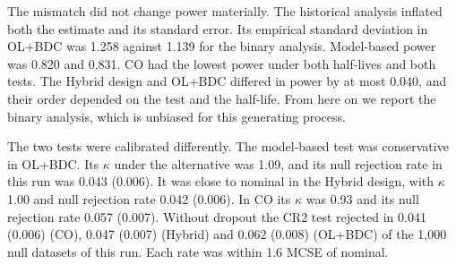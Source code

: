 \documentclass[
  11pt,
]{article}
\begin{document}
\begin{table}
\centering
\caption{\label{tab:tab-calib}Performance without dropout. Bias (MCSE) against the true value $-3.60$. Emp. SD: empirical standard deviation of the estimates. MB: model-based test. CR2: cluster-robust test with Satterthwaite degrees of freedom. Cover: coverage of the 95 percent interval. Size: rejection rate in the null regime. MCSE of power at most 0.014; of size at most 0.008.}
\centering
{}
\end{table}

The mismatch did not change power materially. The historical analysis
inflated both the estimate and its standard error. Its empirical
standard deviation in OL+BDC was
1.258 against
1.139 for the binary
analysis. Model-based power was
0.820 and
0.831. CO had the lowest
power under both half-lives and both tests. The Hybrid design and
OL+BDC differed in power by at most
0.040, and their order depended on the test and
the half-life. From here on we report the binary analysis, which is
unbiased for this generating process.

The two tests were calibrated differently. The model-based test was
conservative in OL+BDC. Its \(\kappa\) under the alternative was
1.09, and its null
rejection rate in this run was
0.043 (0.006).
It was close to nominal in the Hybrid design, with \(\kappa\)
1.00 and null rejection
rate
0.042 (0.006).
In CO its \(\kappa\) was
0.93 and its null rejection
rate
0.057 (0.007).
Without dropout the CR2 test rejected in
0.041 (0.006)
(CO),
0.047 (0.007)
(Hybrid) and
0.062 (0.008)
(OL+BDC) of the 1,000 null datasets of this run.
Each rate was within 1.6 MCSE of
nominal.
\end{document}
